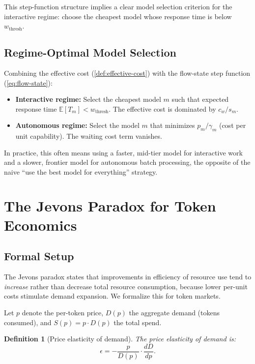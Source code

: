 \documentclass[11pt, a4paper, copyright]{googledeepmind}
\newtheorem{definition}{Definition}[section]
\begin{document}
This step-function structure implies a clear model selection criterion for the interactive regime: choose the cheapest model whose response time is below $w_{\text{thresh}}$.

\subsection{Regime-Optimal Model Selection}

Combining the effective cost (\cref{def:effective-cost}) with the flow-state step function (\cref{eq:flow-state}):

\begin{itemize}[nosep]
    \item \textbf{Interactive regime:} Select the cheapest model $m$ such that expected response time $\mathbb{E}[T_m] < w_{\text{thresh}}$. The effective cost is dominated by $c_w / s_m$.
    \item \textbf{Autonomous regime:} Select the model $m$ that minimizes $p_m / \gamma_m$ (cost per unit capability). The waiting cost term vanishes.
\end{itemize}

In practice, this often means using a faster, mid-tier model for interactive work and a slower, frontier model for autonomous batch processing, the opposite of the naive ``use the best model for everything'' strategy.


\section{The Jevons Paradox for Token Economics}\label{sec:jevons}

\subsection{Formal Setup}

The Jevons paradox \citep{jevons1865} states that improvements in efficiency of resource use tend to \emph{increase} rather than decrease total resource consumption, because lower per-unit costs stimulate demand expansion. We formalize this for token markets.

Let $p$ denote the per-token price, $D(p)$ the aggregate demand (tokens consumed), and $S(p) = p \cdot D(p)$ the total spend.

\begin{definition}[Price elasticity of demand]\label{def:elasticity}
The \emph{price elasticity of demand} is:
\begin{equation}\label{eq:elasticity}
    \epsilon = -\frac{p}{D(p)} \cdot \frac{dD}{dp}.
\end{equation}
\end{definition}
\end{document}
